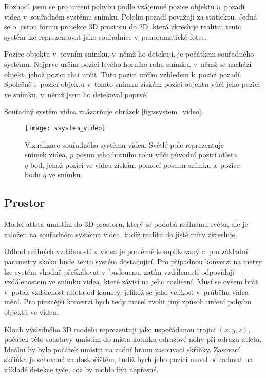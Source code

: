 Rozhodl jsem se pro určení pohybu podle vzájemné pozice objektu a~pozadí videa v~souřadném systému snímku. Polohu pozadí považuji za statickou. Jedná se o~jistou formu projekce 3D prostoru do 2D, která zkresluje realitu, tento systém lze reprezentovat jako souřadnice v~panoramatické fotce.

Pozice objektu v~prvním snímku, v~němž ho detekuji, je počátkem souřadného systému. Nejprve určím pozici levého horního rohu snímku, v~němž se nachází objekt, jehož pozici chci určit. Tuto pozici určím vzhledem k~pozici pozadí. Společně s~pozicí objektu v~tomto snímku získám pozici objektu vůči jeho pozici ve snímku, v~němž jsem ho detekoval poprvé.

Souřadný systém videa znázorňuje obrázek \ref{fig:ssystem_video}.

\begin{figure}[h]\centering
    \texttt{[image: ssystem\_video]}
    \caption{
        \centering\small
        Vizualizace souřadného systému videa. Světlé pole reprezentuje snímek videa, $p$ posun jeho horního rohu vůči původní pozici atleta, $q$ bod, jehož pozici ve videu získám pomocí posunu snímku a~pozice bodu $q$ ve snímku.
    }
    \label{fig:ssystemvideo}
\end{figure}




\subsection{Prostor}

Model atleta umístím do 3D prostoru, který se podobá reálnému světu, ale je založen na souřadném systému videa, tudíž realitu do jisté míry zkresluje.

Odhad reálných vzdáleností z~videa je poměrně komplikovaný a~pro základní parametry skoku bude tento systém dostačující. Pro případnou konverzi na metry lze systém vhodně přeškálovat v~budoucnu, zatím vzdálenosti odpovídají vzdálenostem ve snímku videa, které závisí na jeho rozlišení. Musí se ovšem brát v~potaz vzdálenost atleta od kamery, jelikož se jeho velikost v~průběhu videa mění. Pro přesnější konverzi bych tedy musel zvolit jiný způsob určení pohybu objektů ve videu.

Kloub výsledného 3D modelu reprezentuji jako uspořádanou trojici $(x,y,z)$, počátek této soustavy umístím do místa kotníku odrazové nohy při odrazu atleta. Ideální by bylo počátek umístit na zadní hranu zasouvací skříňky. Zasovací skříňka je schovaná za doskočištěm, tudíž bych jeho pozici musel odhadovat na základě detekce tyče, což by mohlo být nepřesné.

